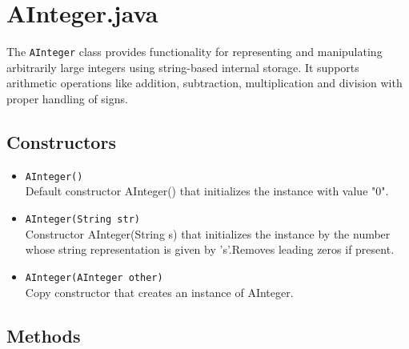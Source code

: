 \documentclass{article}
\begin{document}
\section{AInteger.java}

The \texttt{AInteger} class provides functionality for representing and manipulating arbitrarily large integers using string-based internal storage. It supports arithmetic operations like addition, subtraction, multiplication and division with proper handling of signs.

\subsection*{Constructors}

\begin{itemize}
    \item \texttt{AInteger()} \\
    Default constructor AInteger() that initializes the instance with value "0".

    \item \texttt{AInteger(String str)} \\
    Constructor AInteger(String s) that initializes the instance by the number whose string representation is given by ’s’.Removes leading zeros if present.
    \item \texttt{AInteger(AInteger other)} \\
    Copy constructor that creates an instance of AInteger.
\end{itemize}


\subsection*{Methods}
\end{document}
